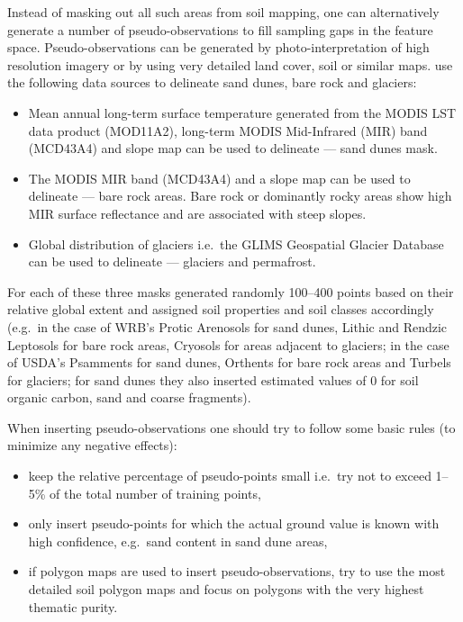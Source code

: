 \documentclass[graybox,natbib,nospthms,UStrade]{svmono}
\begin{document}
Instead of masking out all such areas from soil mapping, one can alternatively generate
a number of pseudo-observations to fill sampling gaps in the feature space. Pseudo-observations
can be generated by photo-interpretation of high resolution imagery or by using very
detailed land cover, soil or similar maps. \citet{Hengl2017SoilGrids250m} use the following data
sources to delineate sand dunes, bare rock and glaciers:

\begin{itemize}
\item
  Mean annual long-term surface temperature generated from the
  MODIS LST data product (MOD11A2), long-term MODIS Mid-Infrared (MIR)
  band (MCD43A4) and slope map can be used to delineate --- sand dunes mask.
\item
  The MODIS MIR band (MCD43A4) and a slope map can be used to delineate ---
  bare rock areas. Bare rock or dominantly rocky areas show high MIR
  surface reflectance and are associated with steep slopes.
\item
  Global distribution of glaciers i.e.~the GLIMS Geospatial Glacier Database
  \citep{raup2007glims} can be used to delineate --- glaciers and permafrost.
\end{itemize}

For each of these three masks \citet{Hengl2017SoilGrids250m} generated randomly 100--400 points
based on their relative global extent and assigned soil properties and
soil classes accordingly (e.g.~in the case of WRB's Protic Arenosols for
sand dunes, Lithic and Rendzic Leptosols for bare rock areas, Cryosols
for areas adjacent to glaciers; in the case of USDA's Psamments for sand
dunes, Orthents for bare rock areas and Turbels for glaciers; for sand
dunes they also inserted estimated values of 0 for soil organic carbon, sand
and coarse fragments).

When inserting pseudo-observations one should try to follow some basic rules
(to minimize any negative effects):

\begin{itemize}
\item
  keep the relative percentage of pseudo-points small i.e.~try not to
  exceed 1--5\% of the total number of training points,
\item
  only insert pseudo-points for which the actual ground value is known
  with high confidence, e.g.~sand content in sand dune areas,
\item
  if polygon maps are used to insert pseudo-observations, try to
  use the most detailed soil polygon maps and focus on polygons with
  the very highest thematic purity.
\end{itemize}
\end{document}
